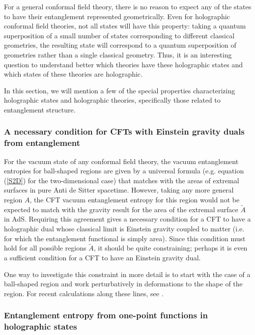 \documentclass[12pt,epsf]{article}
\begin{document}
For a general conformal field theory, there is no reason to expect any of the states to have their entanglement represented geometrically. Even for holographic conformal field theories, not all states will have this property: taking a quantum superposition of a small number of states corresponding to different classical geometries, the resulting state will correspond to a quantum superposition of geometries rather than a single classical geometry. Thus, it is an interesting question to understand better which theories have these holographic states and which states of these theories are holographic.

In this section, we will mention a few of the special properties characterizing holographic states and holographic theories, specifically those related to entanglement structure.

\subsubsection*{A necessary condition for CFTs with Einstein gravity duals from entanglement}

For the vacuum state of any conformal field theory, the vacuum entanglement entropies for ball-shaped regions are given by a universal formula (e.g. equation (\ref{S2D}) for the two-dimensional case) that matches with the areas of extremal surfaces in pure Anti de Sitter spacetime. However, taking any more general region $A$, the CFT vacuum entanglement entropy for this region would not be expected to match with the gravity result for the area of the extremal surface $\tilde{A}$ in AdS. Requiring this agreement gives a necessary condition for a CFT to have a holographic dual whose classical limit is Einstein gravity coupled to matter (i.e. for which the entanglement functional is simply area). Since this condition must hold for all possible regions $\tilde{A}$, it should be quite constraining; perhaps it is even a sufficient condition for a CFT  to have an Einstein gravity dual.

One way to investigate this constraint in more detail is to start with the case of a ball-shaped region and work perturbatively in deformations to the shape of the region. For recent calculations along these lines, see \cite{Faulkner:2015csl}.

\subsubsection*{Entanglement entropy from one-point functions in holographic states}
\end{document}
